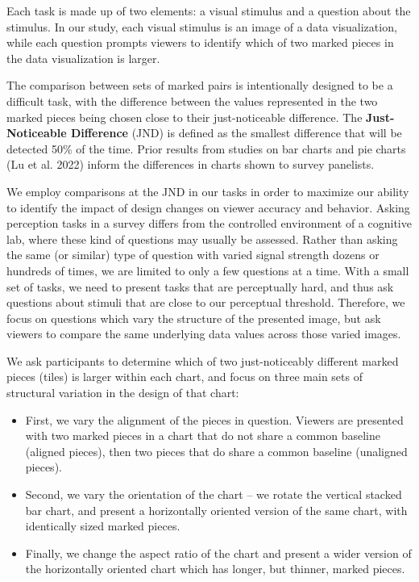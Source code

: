 \documentclass[
]{jds}
\begin{document}
Each task is made up of two elements: a visual stimulus and a question
about the stimulus. In our study, each visual stimulus is an image of a
data visualization, while each question prompts viewers to identify
which of two marked pieces in the data visualization is larger.

The comparison between sets of marked pairs is intentionally designed to
be a difficult task, with the difference between the values represented
in the two marked pieces being chosen close to their just-noticeable
difference. The \textbf{Just-Noticeable Difference} (JND) is defined as
the smallest difference that will be detected 50\% of the time. Prior
results from studies on bar charts and pie charts (Lu et al. 2022)
inform the differences in charts shown to survey panelists.

We employ comparisons at the JND in our tasks in order to maximize our
ability to identify the impact of design changes on viewer accuracy and
behavior. Asking perception tasks in a survey differs from the
controlled environment of a cognitive lab, where these kind of questions
may usually be assessed. Rather than asking the same (or similar) type
of question with varied signal strength dozens or hundreds of times, we
are limited to only a few questions at a time. With a small set of
tasks, we need to present tasks that are perceptually hard, and thus ask
questions about stimuli that are close to our perceptual threshold.
Therefore, we focus on questions which vary the structure of the
presented image, but ask viewers to compare the same underlying data
values across those varied images.

We ask participants to determine which of two just-noticeably different
marked pieces (tiles) is larger within each chart, and focus on three
main sets of structural variation in the design of that chart:

\begin{itemize}
\item
  First, we vary the alignment of the pieces in question. Viewers are
  presented with two marked pieces in a chart that do not share a common
  baseline (aligned pieces), then two pieces that do share a common
  baseline (unaligned pieces).
\item
  Second, we vary the orientation of the chart -- we rotate the vertical
  stacked bar chart, and present a horizontally oriented version of the
  same chart, with identically sized marked pieces.
\item
  Finally, we change the aspect ratio of the chart and present a wider
  version of the horizontally oriented chart which has longer, but
  thinner, marked pieces.
\end{itemize}
\end{document}
